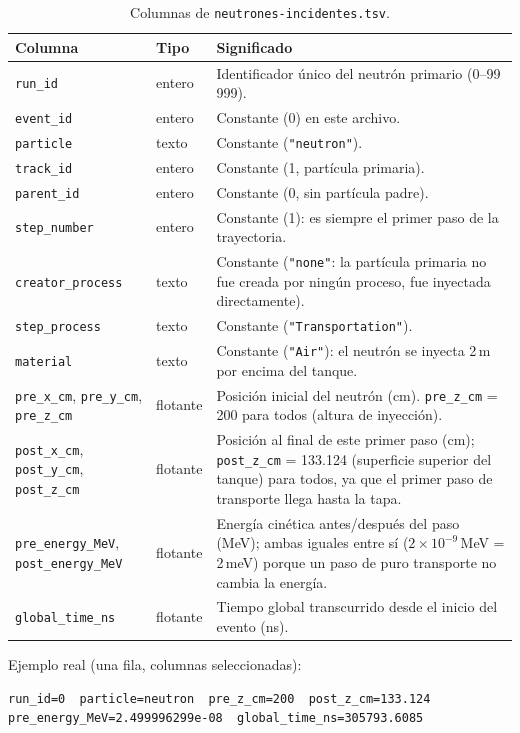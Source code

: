 \documentclass[11pt,a4paper]{article}
\newcommand{\archivo}[1]{\texttt{#1}} %
\newcommand{\var}[1]{\texttt{#1}}
\begin{document}
\begin{table}[H]
\centering
\small
\begin{tabularx}{\linewidth}{l l X}
\toprule
\textbf{Columna} & \textbf{Tipo} & \textbf{Significado} \\
\midrule
\var{run\_id} & entero & Identificador único del neutrón primario (0--99\,999). \\
\var{event\_id} & entero & Constante (0) en este archivo. \\
\var{particle} & texto & Constante (\var{"neutron"}). \\
\var{track\_id} & entero & Constante (1, partícula primaria). \\
\var{parent\_id} & entero & Constante (0, sin partícula padre). \\
\var{step\_number} & entero & Constante (1): es siempre el primer paso de la trayectoria. \\
\var{creator\_process} & texto & Constante (\var{"none"}: la partícula primaria no fue creada por
ningún proceso, fue inyectada directamente). \\
\var{step\_process} & texto & Constante (\var{"Transportation"}). \\
\var{material} & texto & Constante (\var{"Air"}): el neutrón se inyecta 2\,m por encima del tanque. \\
\var{pre\_x\_cm}, \var{pre\_y\_cm}, \var{pre\_z\_cm} & flotante & Posición inicial del neutrón (cm).
\var{pre\_z\_cm} = 200 para todos (altura de inyección). \\
\var{post\_x\_cm}, \var{post\_y\_cm}, \var{post\_z\_cm} & flotante & Posición al final de este
primer paso (cm); \var{post\_z\_cm} = 133.124 (superficie superior del tanque) para todos, ya que
el primer paso de transporte llega hasta la tapa. \\
\var{pre\_energy\_MeV}, \var{post\_energy\_MeV} & flotante & Energía cinética antes/después del
paso (MeV); ambas iguales entre sí ($2\times10^{-9}$\,MeV = 2\,meV) porque un paso de puro
transporte no cambia la energía. \\
\var{global\_time\_ns} & flotante & Tiempo global transcurrido desde el inicio del evento (ns). \\
\bottomrule
\end{tabularx}
\caption{Columnas de \archivo{neutrones-incidentes.tsv}.}
\end{table}

\noindent Ejemplo real (una fila, columnas seleccionadas):
\begin{lstlisting}
run_id=0  particle=neutron  pre_z_cm=200  post_z_cm=133.124  pre_energy_MeV=2.499996299e-08  global_time_ns=305793.6085
\end{lstlisting}
\end{document}
